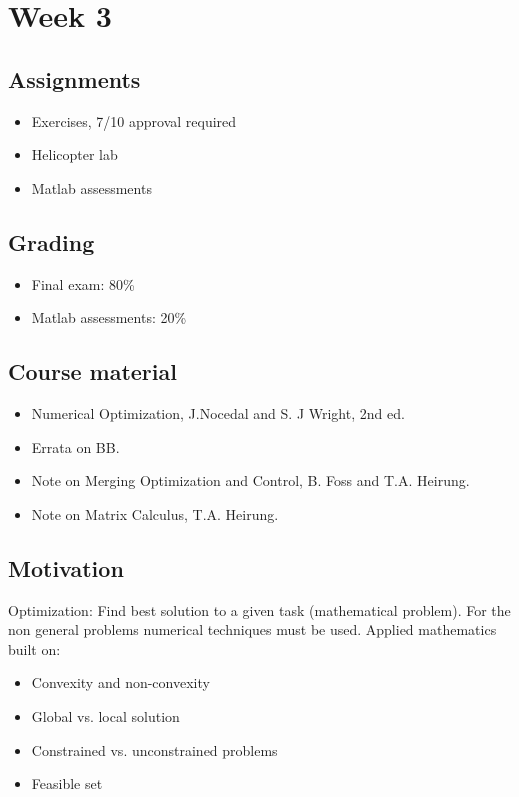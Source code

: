 \section{Week 3}

\subsection{Assignments}
\begin{itemize}
    \item Exercises, 7/10 approval required
    \item Helicopter lab
    \item Matlab assessments
\end{itemize}


\subsection{Grading}
\begin{itemize}
    \item Final exam: 80\%
    \item Matlab assessments: 20\%
\end{itemize}


\subsection{Course material}
\begin{itemize}
    \item Numerical Optimization, J.Nocedal and S. J Wright, 2nd ed.
    \item Errata on BB.
    \item Note on Merging Optimization and Control, B. Foss and T.A. Heirung.
    \item Note on Matrix Calculus, T.A. Heirung.
\end{itemize}

\subsection{Motivation}
Optimization: Find best solution to a given task (mathematical problem).
For the non general problems numerical techniques must be used.
Applied mathematics built on:
\begin{itemize}
    \item Convexity and non-convexity
    \item Global vs. local solution
    \item Constrained vs. unconstrained problems
    \item Feasible set
\end{itemize}

